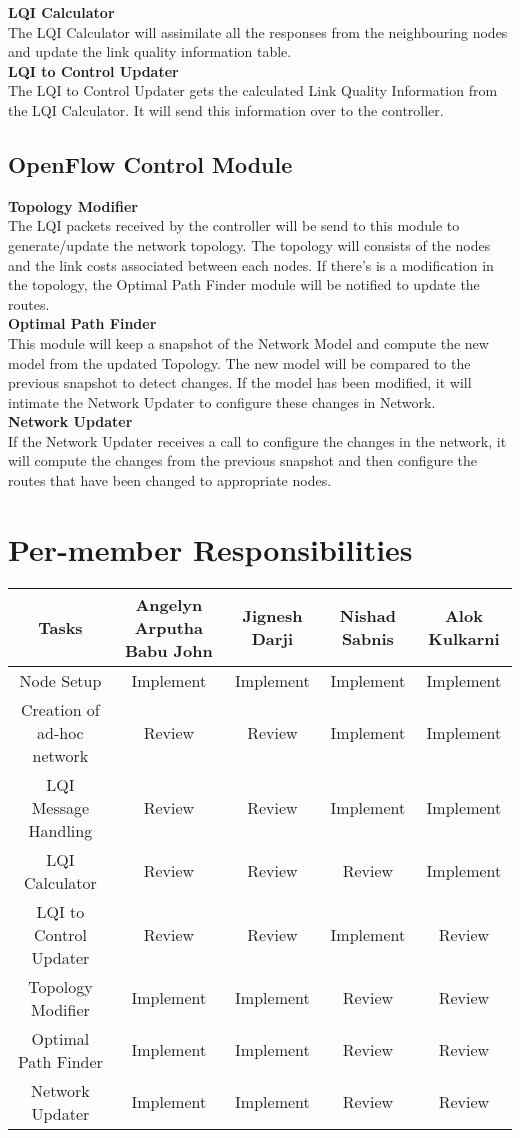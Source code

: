 \documentclass{article}
\begin{document}
\noindent \textbf{LQI Calculator} \\
The LQI Calculator will assimilate all the responses from the neighbouring nodes and update the link quality information
table.\\

\noindent \textbf{LQI to Control Updater} \\
The LQI to Control Updater gets the calculated Link Quality Information from the LQI Calculator. It will send this
information over to the controller. \\
\subsection{OpenFlow Control Module}
\noindent \textbf{Topology Modifier} \\
The LQI packets received by the controller will be send to this module to generate/update the network topology. The
topology will consists of the nodes and the link costs associated between each nodes. If there’s is a modification in
the topology, the Optimal Path Finder module will be notified to update the routes. \\

\noindent \textbf{Optimal Path Finder} \\
This module will keep a snapshot of the Network Model and compute the new model from the updated Topology. The new model
will be compared to the previous snapshot to detect changes. If the model has been modified, it will intimate the
Network Updater to configure these changes in Network.\\

\noindent \textbf{Network Updater} \\
If the Network Updater receives a call to configure the changes in the network, it will compute the changes from the
previous snapshot and then configure the routes that have been changed to appropriate nodes.
\section{Per-member Responsibilities}
\begin{tabular}{  | c | c | c | c | c |}
\hline
Tasks	&	Angelyn Arputha Babu John	&	Jignesh Darji	&	Nishad Sabnis	&	Alok Kulkarni \\
\hline \hline
Node Setup	&	Implement	&	Implement	&	Implement	&	Implement \\
Creation of ad-hoc network	&	Review	&	Review	&	Implement	&	Implement \\
LQI Message Handling	&	Review	&	Review	&	Implement	&	Implement \\ 
LQI Calculator	&	Review	&	Review	&	Review	&	Implement\\ 
LQI to Control Updater	&	Review	&	Review	&	Implement	&	Review \\
Topology Modifier	&	Implement	&	Implement	&	Review	&	Review\\
Optimal Path Finder	&	Implement	&	Implement	&	Review	&	Review\\
Network Updater	&	Implement	&	Implement	&	Review	&	Review\\
\hline
\end{tabular}
\end{document}
